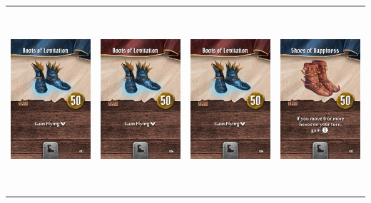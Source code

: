 \documentclass{minimal}
\begin{document}
{\begin{longtable}{llll}
\includegraphics[width=44mm,height=68mm]{./64-151/gh-071a-boots-of-levitation.png} &
\includegraphics[width=44mm,height=68mm]{./64-151/gh-071b-boots-of-levitation.png} &
\includegraphics[width=44mm,height=68mm]{./64-151/gh-071b-boots-of-levitation.png} &
\includegraphics[width=44mm,height=68mm]{./64-151/gh-072a-shoes-of-happiness.png}\\ 

\end{longtable}}
\end{document}
